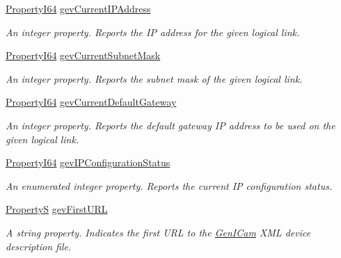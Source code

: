 \begin{DoxyCompactItemize}
\hyperlink{group___common_interface_ga81749b2696755513663492664a18a893}{Property\+I64} \hyperlink{classmv_i_m_p_a_c_t_1_1acquire_1_1_gen_i_cam_1_1_transport_layer_control_a4628b9bb9f9cb0963f8941f6e823aec7}{gev\+Current\+I\+P\+Address}
\begin{DoxyCompactList}\small\item\em An integer property. Reports the I\+P address for the given logical link. \end{DoxyCompactList}\item 
\hyperlink{group___common_interface_ga81749b2696755513663492664a18a893}{Property\+I64} \hyperlink{classmv_i_m_p_a_c_t_1_1acquire_1_1_gen_i_cam_1_1_transport_layer_control_a918962f6fec862f87de9d3f4a06aea01}{gev\+Current\+Subnet\+Mask}
\begin{DoxyCompactList}\small\item\em An integer property. Reports the subnet mask of the given logical link. \end{DoxyCompactList}\item 
\hyperlink{group___common_interface_ga81749b2696755513663492664a18a893}{Property\+I64} \hyperlink{classmv_i_m_p_a_c_t_1_1acquire_1_1_gen_i_cam_1_1_transport_layer_control_af61d2dde90b5f4b07844d681009e4e7b}{gev\+Current\+Default\+Gateway}
\begin{DoxyCompactList}\small\item\em An integer property. Reports the default gateway I\+P address to be used on the given logical link. \end{DoxyCompactList}\item 
\hyperlink{group___common_interface_ga81749b2696755513663492664a18a893}{Property\+I64} \hyperlink{classmv_i_m_p_a_c_t_1_1acquire_1_1_gen_i_cam_1_1_transport_layer_control_a9d9ee35e7f3ce8b03ef528c4e079c5b1}{gev\+I\+P\+Configuration\+Status}
\begin{DoxyCompactList}\small\item\em An enumerated integer property. Reports the current I\+P configuration status. \end{DoxyCompactList}\item 
\hyperlink{classmv_i_m_p_a_c_t_1_1acquire_1_1_property_s}{Property\+S} \hyperlink{classmv_i_m_p_a_c_t_1_1acquire_1_1_gen_i_cam_1_1_transport_layer_control_a4ad5abe5d299df7a3216e23dd572305b}{gev\+First\+U\+R\+L}
\begin{DoxyCompactList}\small\item\em A string property. Indicates the first U\+R\+L to the \hyperlink{namespacemv_i_m_p_a_c_t_1_1acquire_1_1_gen_i_cam}{Gen\+I\+Cam} X\+M\+L device description file. \end{DoxyCompactList}\item 

\end{DoxyCompactItemize}
